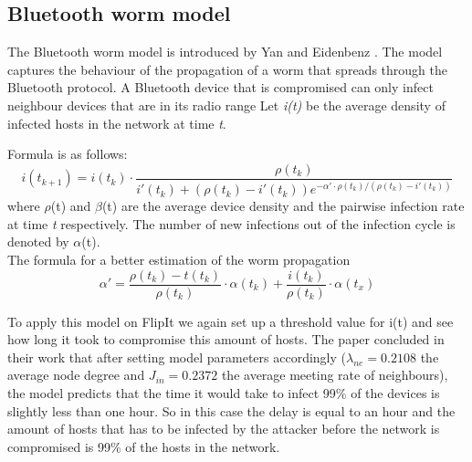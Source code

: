 \subsection{Bluetooth worm model}

The Bluetooth worm model is introduced by Yan and Eidenbenz \citep{yan2009modeling}. The model captures the behaviour of the propagation of a worm that spreads through the Bluetooth protocol. 
A Bluetooth device that is compromised can only infect neighbour devices that are in its radio range
Let \textit{i(t)} be the average density of infected hosts in the network at time \textit{t}.

Formula is as follows: 
\begin{equation}
i(t_{k+1})=i(t_{k}) \cdot \dfrac{\rho(t_{k})}{i'(t_{k}) + (\rho(t_{k}) - i'(t_{k}))e^{-\alpha' \cdot \rho(t_{k}) / (\rho(t_{k}) - i'(t_{k}))}}
\end{equation}
where $\rho$(t) and $\beta$(t) are the average device density and the pairwise infection rate at time \textit{t} respectively. The number of new infections out of the infection cycle is denoted by $\alpha$(t).\\

The formula for a better estimation of the worm propagation
\begin{equation}
\alpha'=\dfrac{\rho(t_{k})-t(t_{k})}{\rho(t_{k})} \cdot \alpha(t_{k}) + \dfrac{i(t_{k})}{\rho(t_{k})} \cdot \alpha(t_{x})
\end{equation}

To apply this model on FlipIt we again set up a threshold value for i(t) and see how long it took to compromise this amount of hosts.  The paper concluded in their work  that after setting model parameters accordingly ($\lambda_{ne} = 0.2108$ the average node degree and $J_{in}= 0.2372$ the average meeting rate of neighbours), the model predicts that the time it would take to infect 99$\%$ of the devices is slightly less than one hour. So in this case the delay is equal to an hour and the amount of hosts that has to be infected by the attacker before the network is compromised is 99$\%$ of the hosts in the network.


